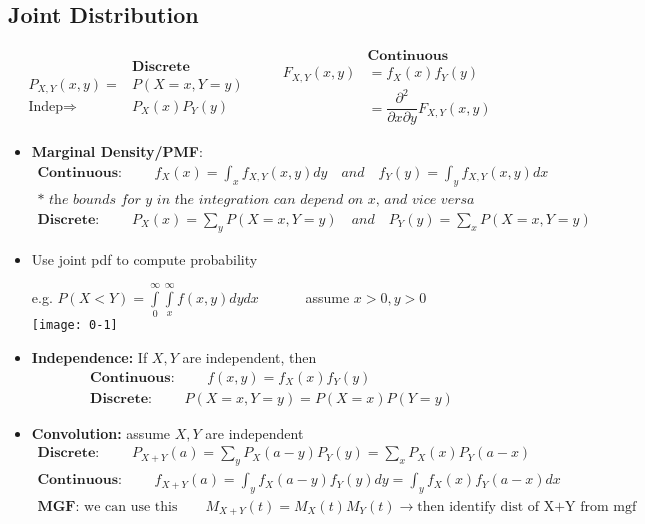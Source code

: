 \subsection*{Joint Distribution}
\begin{equation*}
	\begin{split}
		& \textbf{Discrete}\\
		P_{X,Y}(x,y) = & P(X=x, Y=y)\\
		\text{Indep} \Rightarrow & P_X(x)P_Y(y)
	\end{split}\quad \quad
	\begin{split}
		& \textbf{Continuous}\\
		F_{X,Y}(x,y) & = f_X(x) f_Y(y)\\
		& = \dfrac{\partial^2}{\partial x \partial y} F_{X,Y}(x,y)
	\end{split}
\end{equation*}
\begin{itemize}
	\item \textbf{Marginal Density/PMF}:
	\begin{gather*}
		\textbf{Continuous: }\quad \quad f_X(x) = \int_x f_{X,Y}(x,y)dy \quad \textit{and} \quad f_Y(y) = \int_y f_{X,Y}(x,y)dx\\
		\textit{* the bounds for y in the integration can depend on x, and vice versa}\\
		\textbf{Discrete: }\quad \quad P_X(x) = \sum\limits_y P(X=x,Y=y) \quad \textit{and} \quad P_Y(y) = \sum\limits_x P(X=x,Y=y) 
	\end{gather*}
	\item Use joint pdf to compute probability
	\begin{center}
		e.g. $P(X < Y) = \int\limits_0^\infty \int\limits_x^\infty f(x,y)dy dx \quad \quad \quad$ assume $x>0, y>0$\\
		\texttt{[image: 0-1]}
	\end{center}
	\item \textbf{Independence: } If $X,Y$ are independent, then 
	\begin{gather*}
		\textbf{Continuous: }\quad \quad f(x,y) = f_X(x)f_Y(y)\\
		\textbf{Discrete: }\quad \quad P(X=x, Y=y) = P(X=x) P(Y=y)
	\end{gather*}
	\item \textbf{Convolution: } assume $X,Y$ are independent
	\begin{gather*}
		\textbf{Discrete: }\quad \quad P_{X+Y}(a) = \sum\limits_y P_X(a-y)P_Y(y) = \sum\limits_x P_X(x)P_Y(a-x)\\
		\textbf{Continuous: }\quad \quad f_{X+Y}(a) = \int_y f_X(a-y)f_Y(y)dy = \int_y f_X(x)f_Y(a-x)dx\\
		\textbf{MGF: }\text{we can use this} \quad \quad M_{X+Y}(t) = M_X(t) M_Y(t) \longrightarrow \text{then identify dist of X+Y from mgf} 
	\end{gather*}
\end{itemize}

